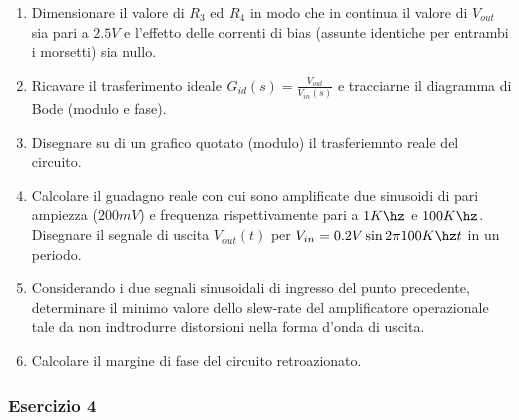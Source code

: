 \documentclass[\main/main.tex]{subfiles}
\begin{document}
\begin{enumerate}
\item Dimensionare il valore di $R_3$ ed $R_4$ in modo che in continua il valore di $V_{out}$ sia pari a $2.5V$ e l'effetto delle correnti di bias (assunte identiche per entrambi i morsetti) sia nullo.
\item Ricavare il trasferimento ideale $G_{id}(s) = \frac{V_{out}}{V_{in}(s)}$ e tracciarne il diagramma di Bode (modulo e fase).
\item Disegnare su di un grafico quotato (modulo) il trasferiemnto reale del circuito.
\item Calcolare il guadagno reale con cui sono amplificate due sinusoidi di pari ampiezza ($200mV$) e frequenza rispettivamente pari a $1K\hz$ e $100K\hz$. Disegnare il segnale di uscita $V_{out}(t)$ per $V_{in} = 0.2V \sin{2\pi 100K\hz t}$ in un periodo.
\item Considerando i due segnali sinusoidali di ingresso del punto precedente, determinare il minimo valore dello slew-rate del amplificatore operazionale tale da non indtrodurre distorsioni nella forma d'onda di uscita.
\item Calcolare il margine di fase del circuito retroazionato.
\end{enumerate}

\clearpage
\subsubsection{Esercizio 4}
\end{document}
